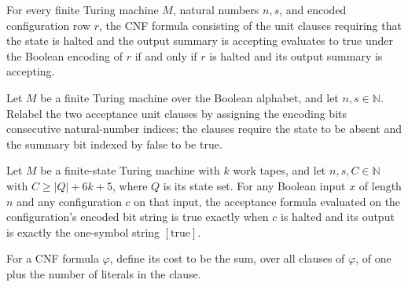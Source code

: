 \begin{theorem}
\label{Complexity.codecAcceptance_eval}
\leanok
{}
For every finite Turing machine $M$, natural numbers $n,s$, and encoded configuration
row $r$, the CNF formula consisting of the unit clauses requiring that the state is
halted and the output summary is accepting evaluates to true under the Boolean encoding
of $r$ if and only if $r$ is halted and its output summary is accepting.
\end{theorem}

\begin{definition}
\label{Complexity.configurationAcceptance}
\leanok
{}
Let $M$ be a finite Turing machine over the Boolean alphabet, and let
$n,s\in\mathbb{N}$. Relabel the two acceptance unit clauses by assigning the encoding
bits consecutive natural-number indices; the clauses require the state to be absent and
the summary bit indexed by false to be true.
\end{definition}

\begin{theorem}
\label{Complexity.configurationAcceptance_eval}
\leanok
{}
Let $M$ be a finite-state Turing machine with $k$ work tapes, and let $n,s,C\in\mathbb
N$ with $C\ge |Q|+6k+5$, where $Q$ is its state set. For any Boolean input $x$ of length
$n$ and any configuration $c$ on that input, the acceptance formula evaluated on the
configuration's encoded bit string is true exactly when $c$ is halted and its output is
exactly the one-symbol string $[\mathrm{true}]$.
\end{theorem}

\begin{definition}
\label{Complexity.codecCnfCost}
\leanok
For a CNF formula $\varphi$, define its cost to be the sum, over all clauses of
$\varphi$, of one plus the number of literals in the clause.
\end{definition}

